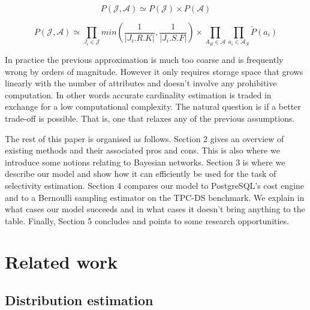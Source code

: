 \documentclass[runningheads]{llncs}
\newcommand{\card}[1]{\left\vert{#1}\right\vert}
\begin{document}
\begin{equation}
    P(\mathcal{J}, \mathcal{A}) \simeq P(\mathcal{J}) \times P(\mathcal{A})
\end{equation}


\begin{equation}
   P(\mathcal{J}, \mathcal{A}) \simeq \prod_{J_i \in \mathcal{J}} min(\frac{1}{\card{J_i.R.K}}, \frac{1}{\card{J_i.S.F}})  \times \prod_{A_R \in \mathcal{A}} \prod_{a_i \in \mathcal{A_R}} \widetilde{P}(a_i)
\end{equation}

In practice the previous approximation is much too coarse and is frequently wrong by orders of magnitude. However it only requires storage space that grows linearly with the number of attributes and doesn't involve any prohibitive computation. In other words accurate cardinality estimation is traded in exchange for a low computational complexity. The natural question is if a better trade-off is possible. That is, one that relaxes any of the previous assumptions.




The rest of this paper is organised as follows. Section 2 gives an overview of existing methods and their associated pros and cons. This is also where we introduce some notions relating to Bayesian networks. Section 3 is where we describe our model and show how it can efficiently be used for the task of selectivity estimation. Section 4 compares our model to PostgreSQL's cost engine and to a Bernoulli sampling estimator on the TPC-DS benchmark. We explain in what cases our model succeeds and in what cases it doesn't bring anything to the table. Finally, Section 5 concludes and points to some research opportunities.


\section{Related work}

\subsection{Distribution estimation} \label{subsec:statistical-summaries}



\end{document}
